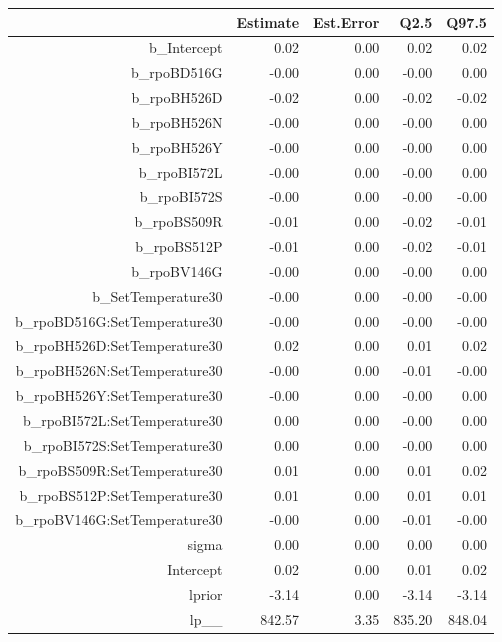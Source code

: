\begin{table}[ht]
\centering
\begin{tabular}{rrrrr}
  \hline
 & Estimate & Est.Error & Q2.5 & Q97.5 \\ 
  \hline
b\_Intercept & 0.02 & 0.00 & 0.02 & 0.02 \\ 
  b\_rpoBD516G & -0.00 & 0.00 & -0.00 & 0.00 \\ 
  b\_rpoBH526D & -0.02 & 0.00 & -0.02 & -0.02 \\ 
  b\_rpoBH526N & -0.00 & 0.00 & -0.00 & 0.00 \\ 
  b\_rpoBH526Y & -0.00 & 0.00 & -0.00 & 0.00 \\ 
  b\_rpoBI572L & -0.00 & 0.00 & -0.00 & 0.00 \\ 
  b\_rpoBI572S & -0.00 & 0.00 & -0.00 & -0.00 \\ 
  b\_rpoBS509R & -0.01 & 0.00 & -0.02 & -0.01 \\ 
  b\_rpoBS512P & -0.01 & 0.00 & -0.02 & -0.01 \\ 
  b\_rpoBV146G & -0.00 & 0.00 & -0.00 & 0.00 \\ 
  b\_SetTemperature30 & -0.00 & 0.00 & -0.00 & -0.00 \\ 
  b\_rpoBD516G:SetTemperature30 & -0.00 & 0.00 & -0.00 & -0.00 \\ 
  b\_rpoBH526D:SetTemperature30 & 0.02 & 0.00 & 0.01 & 0.02 \\ 
  b\_rpoBH526N:SetTemperature30 & -0.00 & 0.00 & -0.01 & -0.00 \\ 
  b\_rpoBH526Y:SetTemperature30 & -0.00 & 0.00 & -0.00 & 0.00 \\ 
  b\_rpoBI572L:SetTemperature30 & 0.00 & 0.00 & -0.00 & 0.00 \\ 
  b\_rpoBI572S:SetTemperature30 & 0.00 & 0.00 & -0.00 & 0.00 \\ 
  b\_rpoBS509R:SetTemperature30 & 0.01 & 0.00 & 0.01 & 0.02 \\ 
  b\_rpoBS512P:SetTemperature30 & 0.01 & 0.00 & 0.01 & 0.01 \\ 
  b\_rpoBV146G:SetTemperature30 & -0.00 & 0.00 & -0.01 & -0.00 \\ 
  sigma & 0.00 & 0.00 & 0.00 & 0.00 \\ 
  Intercept & 0.02 & 0.00 & 0.01 & 0.02 \\ 
  lprior & -3.14 & 0.00 & -3.14 & -3.14 \\ 
  lp\_\_ & 842.57 & 3.35 & 835.20 & 848.04 \\ 
   \hline
\end{tabular}
\end{table}
